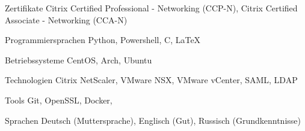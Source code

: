


\begin{cvskills}


\cvskill
{Zertifikate}
{Citrix Certified Professional - Networking (CCP-N), Citrix Certified Associate - Networking (CCA-N)}

\cvskill
{Programmiersprachen} %
{Python, Powershell, C, LaTeX} %


\cvskill
{Betriebssysteme}
{CentOS, Arch, Ubuntu}


\cvskill
{Technologien} %
{Citrix NetScaler, VMware NSX, VMware vCenter, SAML, LDAP} %


\cvskill
{Tools}
{Git, OpenSSL, Docker,   }

\cvskill
{Sprachen} %
{Deutsch (Muttersprache), Englisch (Gut), Russisch (Grundkenntnisse)} %


\end{cvskills}
